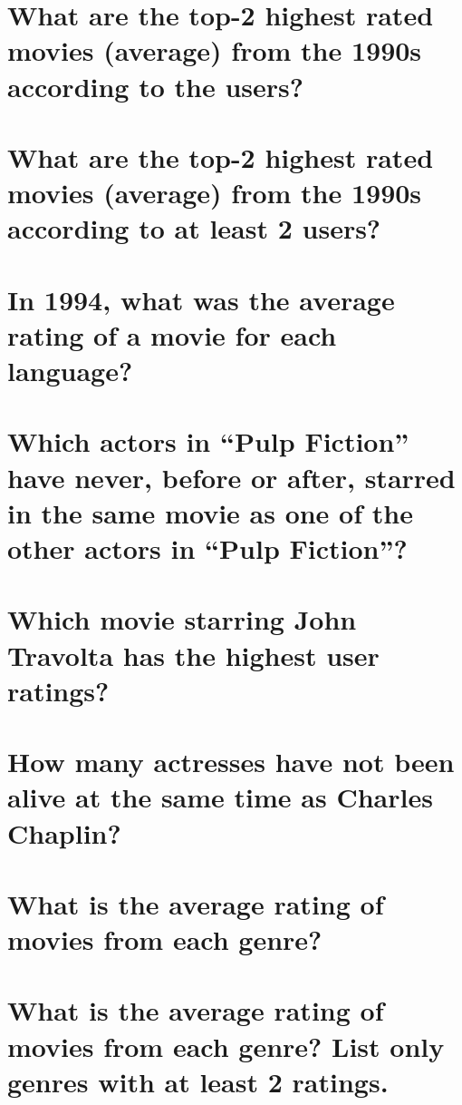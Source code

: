 \documentclass[a4paper,11pt]{memoir}
\begin{document}
\section{What are the top-2 highest rated movies (average) from the 1990s according to the users?}



\section{What are the top-2 highest rated movies (average) from the 1990s according to at least 2 users?}



\section{In 1994, what was the average rating of a movie for each language?}



\section{Which actors in ``Pulp Fiction'' have never, before or after, starred in the same movie as one of the other actors in ``Pulp Fiction''?}



\section{Which movie starring John Travolta has the highest user ratings?}



\section{How many actresses have not been alive at the same time as Charles Chaplin?}



\section{What is the average rating of movies from each genre?}



\section{What is the average rating of movies from each genre? List only genres with at least 2 ratings.}


\end{document}
